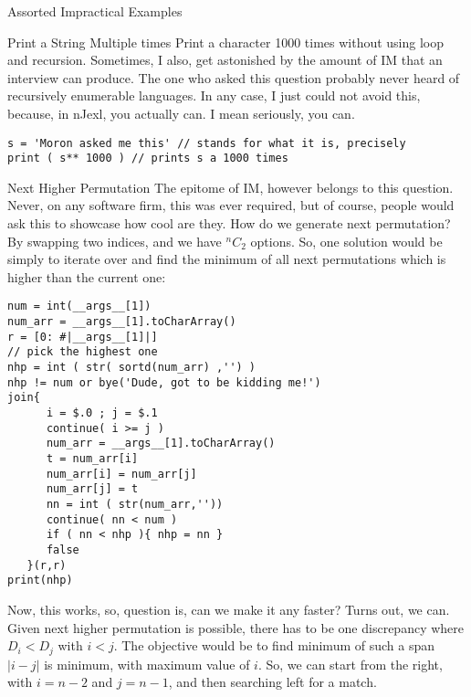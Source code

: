 \begin{section}{Assorted Impractical Examples}
\begin{subsection}{Print a String Multiple times}
Print a character 1000 times without using loop and recursion.
Sometimes, I also, get astonished by the amount of IM that an interview can produce.
The one who asked this question probably never heard of recursively enumerable languages.
In any case, I just could not avoid this, because, in nJexl, you actually can.
I mean seriously, you can.

\begin{center}\begin{minipage}{\linewidth}
\begin{lstlisting}[style=JexlStyle]
s = 'Moron asked me this' // stands for what it is, precisely
print ( s** 1000 ) // prints s a 1000 times 
\end{lstlisting}  
\end{minipage}\end{center} 
\end{subsection}

\begin{subsection}{Next Higher Permutation}
The epitome of IM, however belongs to this question. 
Never, on any software firm, this was ever required, but of course,
people would ask this to showcase how cool are they. 
How do we generate next permutation? 
By swapping two indices, and we have $^nC_2$ options. 
So, one solution would be simply to iterate over and find the minimum
of all next permutations which is higher than the current one:

\begin{center}\begin{minipage}{\linewidth}
\begin{lstlisting}[style=JexlStyle]
num = int(__args__[1])
num_arr = __args__[1].toCharArray() 
r = [0: #|__args__[1]|]
// pick the highest one 
nhp = int ( str( sortd(num_arr) ,'') )
nhp != num or bye('Dude, got to be kidding me!') 
join{
      i = $.0 ; j = $.1 
      continue( i >= j )
      num_arr = __args__[1].toCharArray() 
      t = num_arr[i]
      num_arr[i] = num_arr[j] 
      num_arr[j] = t 
      nn = int ( str(num_arr,''))
      continue( nn < num )
      if ( nn < nhp ){ nhp = nn }
      false 
   }(r,r)
print(nhp)
\end{lstlisting}  
\end{minipage}\end{center} 
Now, this works, so, question is, can we make it any faster?
Turns out, we can. Given next higher permutation is possible, there
has to be one discrepancy where $D_i < D_j $ with $ i < j $. 
The objective would be to find minimum of such a span $|i-j|$ is minimum, with maximum value of $i$.
So, we can start from the right, with $i=n-2$ and $j=n-1$, and then searching left 
for a match.


\end{subsection}
\end{section}
